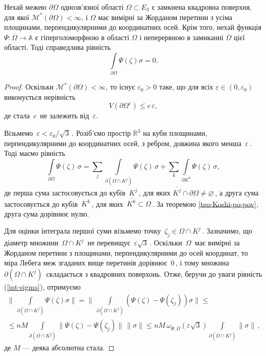 \documentclass[11pt, reqno]{amsart}
\begin{document}
\vskip 1mm

\begin{theorem}\label{Caushy-surface} 
Нехай межею $\partial\Omega$
однозв'язної області $\Omega\subset E_3$ є замкнена квадровна
поверхня, для якої $\mathcal{M}^*(\partial\Omega)<\infty$, і
$\Omega$ має вимірні за Жорданом перетини з усіма площинами, перпендикулярними до
координатних осей. Крім того, нехай функція
$\Psi:\overline{\Omega}\rightarrow\mathbb{A}$ є
гіперголоморфною в області $\Omega$ і неперервною в замиканні
$\overline{\Omega}$ цієї області. Тоді справедлива рівність 
\[\int\limits_{\partial \Omega}\Psi(\zeta)\sigma=0.\]
\end{theorem}

\vskip 1mm


\begin{proof}
Оскільки  $\mathcal{M}^*(\partial\Omega)<\infty$, то існує $\varepsilon_0>0$ таке, що для всіх
$\varepsilon\in(0,\varepsilon_0)$ виконується нерівність
\begin{equation}\label{3-3:teo2,ner-dlja-pover}
V(\partial\Omega^\varepsilon)\leq c\, \varepsilon,
\end{equation}
де стала\, $c$\, не залежить від\, $\varepsilon$.

Візьмемо\, $\varepsilon<\varepsilon_0/\sqrt{3}$\,. Розіб'ємо простір
$\mathbb{R}^3$ на куби площинами, перпендикулярними до координатних
осей, з ребром, довжина якого менша\, $\varepsilon$\,. Тоді маємо рівність
\begin{equation}\label{3-3:form-Koshi-po-pov-1}
\int\limits_{\partial\Omega}\Psi(\zeta)\,\sigma=\sum\limits_j
\int\limits_{\partial(\Omega\cap
K^j)}\Psi(\zeta)\,\sigma+\sum\limits_k \int\limits_{\partial
K^k}\Psi(\zeta)\,\sigma,
\end{equation}
де перша сума застосовується до кубів\, $K^j$\,, для яких
$\overline{K^j}\cap\partial\Omega\ne\varnothing$\,, а друга сума
застосовується до кубів\, $K^k$\,, для яких\,
$\overline{K^k}\subset\Omega$\,. За теоремою
\ref{teo-Koshi-po-pov}, друга сума
дорівнює нулю.

Для оцінки інтеграла першої суми візьмемо точку\,
$\zeta_j\in \Omega\cap K^j$\,. Зазначимо, що діаметр множини\,
$\Omega\cap K^j$\, не перевищує\, $\varepsilon\sqrt {3}$\,.
Оскільки\, $\Omega$\, має вимірні за Жорданом перетини з площинами, перпендикулярними до
осей координат, то міра Лебега меж згаданих вище перетинів дорівнює\, $0$\,,
і тому множина\, $\partial(\Omega\cap K^j)$\, складається з квадровних поверхонь. 
Отже, беручи до уваги рівність (\ref{int-sigma}), отримуємо
\begin{multline}\label{3-3:teo2_ocinka-1}
\biggr\|\,\int\limits_{\partial(\Omega\cap
K^j)}\Psi(\zeta)\sigma\biggr\|=\biggr\|\,\int\limits_{\partial(\Omega\cap
K^j)}(\Psi(\zeta)-\Psi(\zeta_j))\sigma\biggr\|\le\\
\leq nM\int\limits_{\partial(\Omega\cap
K^j)}\|\Psi(\zeta)-\Psi(\zeta_j)\|\,\|\sigma\| \leq
nM\,\omega_{\Psi,\overline{\Omega}}(\varepsilon\sqrt{3})\int\limits
_{\partial(\Omega\cap K^j)}\|\sigma\|\,,
\end{multline}
де $M$ --- деяка абсолютна стала.


\end{proof}
\end{document}
